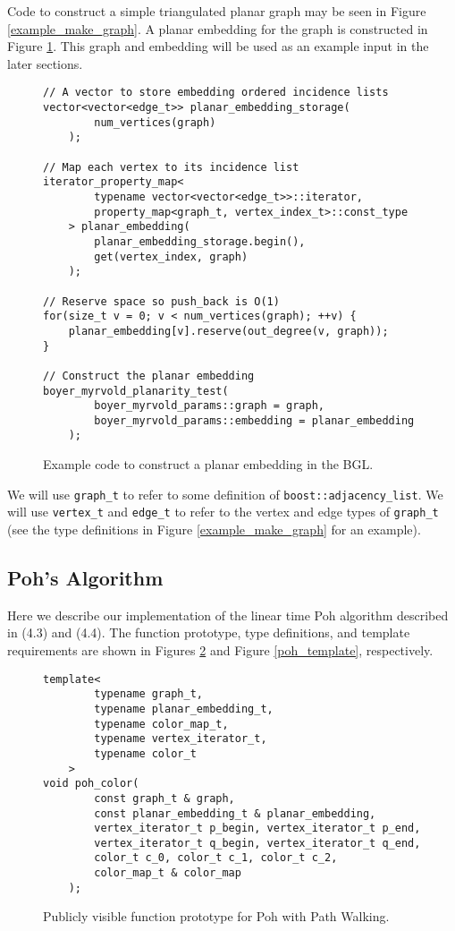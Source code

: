 \documentclass[letterpaper, 12pt]{article}
\theoremstyle{thm}
\begin{document}
Code to construct a simple triangulated planar graph may be seen in Figure
\ref{example_make_graph}. A planar embedding for the graph is constructed
in Figure \ref{example_embed_graph}. 
This graph and embedding will be used as an example input in the later sections.

\begin{figure}
\begin{lstlisting}[frame=single]
// A vector to store embedding ordered incidence lists
vector<vector<edge_t>> planar_embedding_storage(
        num_vertices(graph)
    );

// Map each vertex to its incidence list
iterator_property_map<
        typename vector<vector<edge_t>>::iterator, 
        property_map<graph_t, vertex_index_t>::const_type
    > planar_embedding(
        planar_embedding_storage.begin(),
        get(vertex_index, graph)
    );

// Reserve space so push_back is O(1)
for(size_t v = 0; v < num_vertices(graph); ++v) {
    planar_embedding[v].reserve(out_degree(v, graph));
}

// Construct the planar embedding
boyer_myrvold_planarity_test(
        boyer_myrvold_params::graph = graph,
        boyer_myrvold_params::embedding = planar_embedding
    );
\end{lstlisting}
\caption{Example code to construct a planar embedding in the BGL.}
\label{example_embed_graph}
\end{figure}

We will use \texttt{graph\_t} to refer to some definition of
\texttt{boost::adjacency\_list}. We will use \texttt{vertex\_t} and \texttt{edge\_t}
to refer to the vertex and edge types of \texttt{graph\_t} (see the type
definitions in Figure \ref{example_make_graph} for an example).

\subsection{Poh's Algorithm}

Here we describe our implementation of the linear time Poh algorithm
described in (4.3) and (4.4). The
function prototype, type definitions, and template requirements are shown
in Figures \ref{poh_prototype} and Figure \ref{poh_template}, respectively.

\begin{figure}
\begin{lstlisting}[frame=single]
template<
        typename graph_t,
        typename planar_embedding_t,
        typename color_map_t,
        typename vertex_iterator_t,
        typename color_t
    >
void poh_color(
        const graph_t & graph,
        const planar_embedding_t & planar_embedding,
        vertex_iterator_t p_begin, vertex_iterator_t p_end,
        vertex_iterator_t q_begin, vertex_iterator_t q_end,
        color_t c_0, color_t c_1, color_t c_2,
        color_map_t & color_map
    );
\end{lstlisting}
\caption{Publicly visible function prototype for Poh with Path Walking.}
\label{poh_prototype}
\end{figure}
\end{document}
